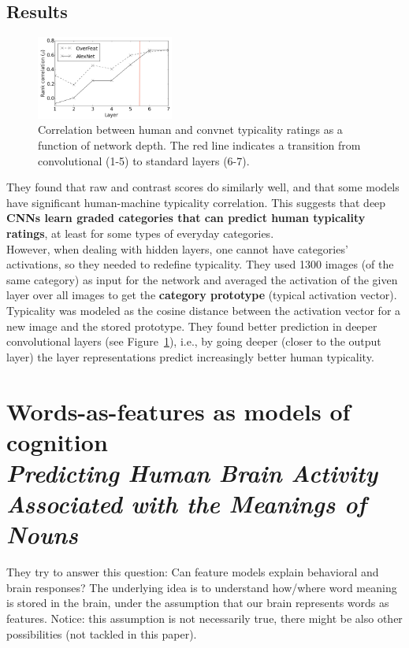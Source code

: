 \subsection{Results}
\begin{figure}
  \centering
  \includegraphics[width=0.4\textwidth]{images/lake.png}
  \caption{Correlation between human and convnet typicality ratings as a function of network depth. The red line indicates a transition from convolutional (1-5) to standard layers (6-7).}
  \label{fig:lake}
\end{figure}

They found that raw and contrast scores do similarly well, and that some models have significant human-machine typicality correlation. This suggests that deep \textbf{CNNs learn graded categories that can predict human typicality ratings}, at least for some types of everyday categories.\\

However, when dealing with hidden layers, one cannot have categories' activations, so they needed to redefine typicality.
They used 1300 images (of the same category) as input for the network and averaged the activation of the given layer over all images to get the \textbf{category prototype} (typical activation vector).
Typicality was modeled as the cosine distance between the activation vector for a new image and the stored prototype. They found better prediction in deeper convolutional layers (see Figure~\ref{fig:lake}), i.e., by going deeper (closer to the output layer) the layer representations predict increasingly better human typicality.


\section[Words-as-features as models of cognition]{Words-as-features as models of cognition\\ \large{\textit{Predicting Human Brain Activity Associated with the Meanings of Nouns}\\ }}
They try to answer this question: Can feature models explain behavioral and brain responses?
The underlying idea is to understand how/where word meaning is stored in the brain, under the assumption that our brain represents words as features. Notice: this assumption is not necessarily true, there might be also other possibilities (not tackled in this paper).

